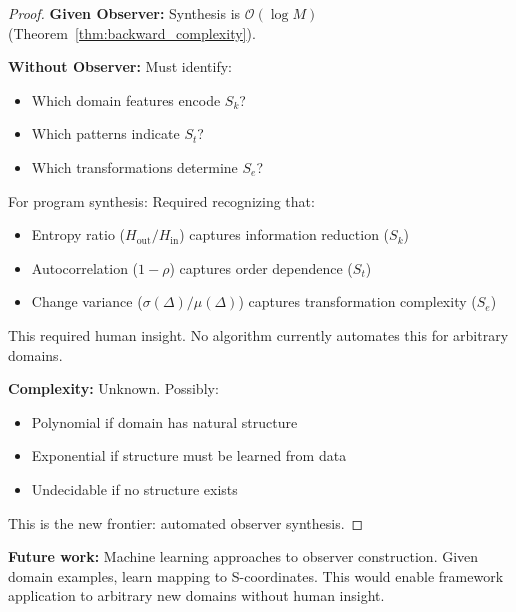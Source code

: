 \documentclass[twocolumn,10pt]{article}
\theoremstyle{definition}
\theoremstyle{remark}
\newcommand{\Sk}{S_k}
\newcommand{\St}{S_t}
\newcommand{\Se}{S_e}
\newcommand{\bigO}{\mathcal{O}}
\begin{document}
\begin{proof}
\textbf{Given Observer:} Synthesis is $\bigO(\log M)$ (Theorem~\ref{thm:backward_complexity}).

\vspace{0.2cm}
\noindent\textbf{Without Observer:} Must identify:
\begin{itemize}
\item Which domain features encode $\Sk$?
\item Which patterns indicate $\St$?
\item Which transformations determine $\Se$?
\end{itemize}

For program synthesis: Required recognizing that:
\begin{itemize}
\item Entropy ratio ($H_{\text{out}}/H_{\text{in}}$) captures information reduction ($\Sk$)
\item Autocorrelation ($1-\rho$) captures order dependence ($\St$)
\item Change variance ($\sigma(\Delta)/\mu(\Delta)$) captures transformation complexity ($\Se$)
\end{itemize}

This required human insight. No algorithm currently automates this for arbitrary domains.

\vspace{0.2cm}
\noindent\textbf{Complexity:} Unknown. Possibly:
\begin{itemize}
\item Polynomial if domain has natural structure
\item Exponential if structure must be learned from data
\item Undecidable if no structure exists
\end{itemize}

This is the new frontier: automated observer synthesis.
\end{proof}

\vspace{0.2cm}
\noindent\textbf{Future work:} Machine learning approaches to observer construction. Given domain examples, learn mapping to S-coordinates. This would enable framework application to arbitrary new domains without human insight.
\end{document}
